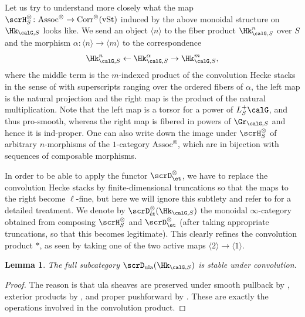 \documentclass[10pt, reqno]{amsart}
\theoremstyle{plain}
\newtheorem{lemma}[theorem]{Lemma}
\theoremstyle{definition}
\numberwithin{equation}{section}
\begin{document}
	
	Let us try to understand more closely what the map $\scrH^\otimes_S\colon \mathrm{Assoc}^\otimes \to \mathrm{Corr}^\otimes(\mathrm{vSt})$ induced by the above monoidal structure on $\Hk_{\calG,S}$ looks like. We send an object $\langle n \rangle$ to the fiber product $\Hk_{\calG,S}^n$ over $S$ and the morphism $\alpha \colon \langle n \rangle \to \langle m \rangle$ to the correspondence \begin{equation}
		\Hk_{\calG,S}^n \leftarrow \Hk_{\calG,S}^{\alpha} \to \Hk_{\calG,S}^m,
	\end{equation} where the middle term is the $m$-indexed product of the convolution Hecke stacks in the sense of  with superscripts ranging over the ordered fibers of $\alpha$, the left map is the natural projection and the right map is the product of the natural multiplication. Note that the left map is a torsor for a power of $L_S^+\calG$, and thus pro-smooth, whereas the right map is fibered in powers of $\Gr_{\calG,S}$ and hence it is ind-proper. One can also write down the image under $\scrH^\otimes_S$ of arbitrary $n$-morphisms of the $1$-category $\mathrm{Assoc}^\otimes$, which are in bijection with sequences of composable morphisms. 
	
	In order to be able to apply the functor $\scrD_{\et}^{\otimes}$, we have to replace the convolution Hecke stacks by finite-dimensional truncations so that the maps to the right become $\ell$-fine, but here we will ignore this subtlety and refer to \cite[Definition 5.1.2, Subsection 5.1.7]{XZ17} for a detailed treatment.
	We denote by $\scrD^\otimes_\mathrm{\acute{e}t}(\Hk_{\calG,S})$ the monoidal $\infty$-category obtained from composing $\scrH_S^\otimes$ and $\scrD_{\et}^\otimes$ (after taking appropriate truncations, so that this becomes legitimate). This clearly refines the convolution product $\ast$, as seen by taking one of the two active maps $\langle 2 \rangle \to \langle 1 \rangle $.
	
	\begin{lemma}
		The full subcategory $\scrD_{\mathrm{ula}}(\Hk_{\calG,S})$ is stable under convolution.
	\end{lemma}
	\begin{proof}
		The reason is that ula sheaves are preserved under smooth pullback by \cite[Proposition IV.2.13]{FS21}, exterior products by \cite[Lemma IV.2.14]{FS21}, and proper pushforward by \cite[Proposition IV.2.11]{FS21}. These are exactly the operations involved in the convolution product.
	\end{proof}
	
\end{document}
